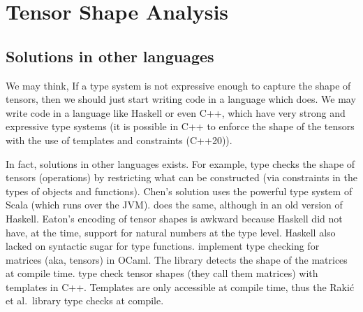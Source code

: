{}

{}

\section{Tensor Shape Analysis}\label{tensor-shape-analysis}

{}

{}

\subsection{Solutions in other languages}%
\label{solutions-in-other-languages}

We may think, If a type system is not expressive enough to capture the
shape of tensors, then we should just start writing code in a language
which does. We may write code in a language like Haskell or even C++,
which have very strong and expressive type systems (it is possible in
C++ to enforce the shape of the tensors with the use of templates and
constraints (C++20)).

In fact, solutions in other languages exists. For example,
\textcite{chen_typesafe_2017} type checks the shape of tensors
(operations) by restricting what can be constructed (via constraints in
the types of objects and functions). Chen's solution uses the powerful
type system of Scala (which runs over the JVM).
\textcite{eaton_statically_2006} does the same, although in an old
version of Haskell. Eaton's encoding of tensor shapes is awkward because
Haskell did not have, at the time, support for natural numbers at the
type level. Haskell also lacked on syntactic sugar for type functions.
\textcite{abe_simple_2015} implement type checking for matrices (aka,
tensors) in OCaml. The library detects the shape of the matrices at
compile time. \textcite{rakic_statically_2012} type check tensor shapes
(they call them matrices) with templates in C++. Templates are only
accessible at compile time, thus the Rakić et al.~library type checks at
compile.

